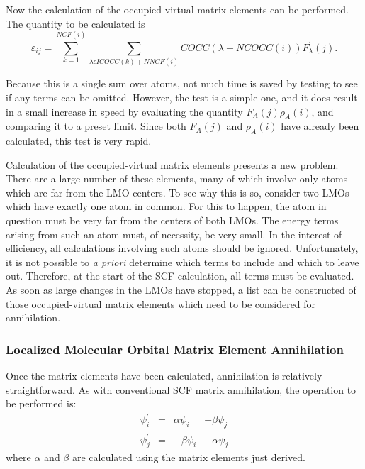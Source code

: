 Now the calculation of the occupied-virtual matrix elements can be performed. 
The quantity to be calculated is
\begin{equation}
\varepsilon_{i j} =
\sum_{k=1}^{NCF(i)}\sum_{\lambda\epsilon ICOCC(k)+NNCF(i)}COCC(\lambda+NCOCC(i))
F_{\lambda}^{'}(j).
\end{equation}

Because this is a single sum over atoms, not much time is saved by testing to
see if any terms can be omitted.  However, the test is a simple one, and  it
does result in a small increase in speed by evaluating the quantity
$F_A(j)\rho_A(i)$, and comparing it to a preset limit.  Since both $F_A(j)$ and
$\rho_A(i)$ have already been calculated, this test is very rapid.

Calculation of the occupied-virtual matrix elements presents a new problem.
There are a large number of these elements, many of which involve only atoms
which are far from the LMO centers.  To see why this is so, consider two LMOs
which have exactly one atom in common.  For this to happen, the atom in
question must be very far from the centers of both LMOs.  The energy terms
arising from such an atom must, of necessity, be very small. In the interest of
efficiency, all calculations involving such atoms should be ignored. 
Unfortunately, it is not possible to {\it a priori} determine which terms to
include and which to leave out.  Therefore, at the start of the SCF
calculation, all terms must be evaluated.  As soon as  large changes in the
LMOs have stopped, a list can be constructed of those occupied-virtual matrix
elements which need to be considered for annihilation.


\subsubsection{Localized Molecular Orbital Matrix Element Annihilation}
Once the matrix elements have been calculated, annihilation is
relatively straightforward.  As with conventional SCF matrix annihilation,
the operation to be performed is:
\begin{equation}
\begin{array}{llrr}
\psi_i^{'}  & = & \alpha\psi_i & + \beta\psi_j \\
\psi_j^{'}  & = &-\beta\psi_i  & +\alpha\psi_j
\end{array}
\end{equation}
where $\alpha$ and $\beta$ are calculated using the matrix elements just
derived.

